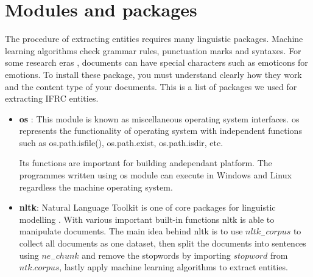 \section{Modules and packages}
The procedure of extracting entities requires many linguistic packages. Machine learning algorithms check grammar rules, punctuation marks and syntaxes. For some    research
eras ,
documents can have special characters such as emoticons for emotions. To install these package, you must understand clearly how they work and the content type of your documents.
This is a list of packages we used for extracting IFRC entities.
\begin{itemize}
\item \textbf{os} : This module is  known as miscellaneous operating system interfaces. os represents the functionality of operating system with independent functions such as os.path.isfile(), os.path.exist, os.path.isdir, etc.  

  Its functions are important for building andependant platform.
  The programmes
  written  using os module  can execute in Windows and Linux regardless the machine operating system. 

\item \textbf{nltk}: Natural Language Toolkit is one of core packages for linguistic modelling . With various important  built-in functions nltk is able to manipulate documents.  The main idea behind nltk is to use $nltk_{-}corpus$ to collect all documents as one dataset, then split the documents into sentences using $ne_{-}chunk$ and  remove the stopwords by  importing $stopword$ from $ntk.corpus$, lastly apply machine learning algorithms to extract entities.


\end{itemize}
